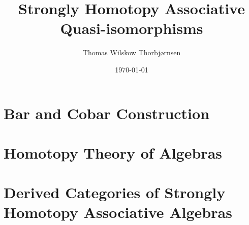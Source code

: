 \documentclass[american,titlepage]{ntnuthesis}
\title{Strongly Homotopy Associative Quasi-isomorphisms}
\author{Thomas Wilskow Thorbjørnsen}
\date{\today}
\begin{document}
    


    \tableofcontents %

    \printglossary[type=\acronymtype] %
    \printglossary                    %


    \chapter{Bar and Cobar Construction}
        

    \chapter{Homotopy Theory of Algebras}
        

    \chapter{Derived Categories of Strongly Homotopy Associative Algebras}
        

    \chapter*{\bibname}
    \printbibliography[heading=none]


    \appendix
\end{document}
